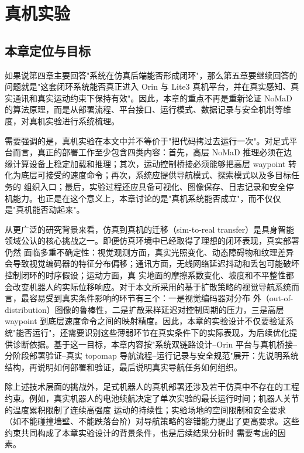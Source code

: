 
\chapter{真机实验}

\section{本章定位与目标}

如果说第四章主要回答"系统在仿真后端能否形成闭环"，那么第五章要继续回答的问题就是"这套闭环系统能否真正进入 Orin 与 Lite3
真机平台，并在真实感知、真实通讯和真实运动约束下保持有效"。因此，本章的重点不再是重新论证 NoMaD
的算法原理，而是从部署流程、平台接口、运行模式、数据记录与安全机制等维度，对真机实验进行系统梳理。

需要强调的是，真机实验在本文中并不等价于"把代码拷过去运行一次"。对足式平台而言，真正的部署工作至少包含四类内容：首先，高层 NoMaD
推理必须在边缘计算设备上稳定加载和推理；其次，运动控制桥接必须能够把高层 waypoint 转化为底层可接受的速度命令；再次，系统应提供导航模式、探索模式以及多目标任务的
组织入口；最后，实验过程还应具备可视化、图像保存、日志记录和安全停机能力。也正是在这个意义上，本章讨论的是"真机系统能否成立"，而不仅仅是"真机能否动起来"。

从更广泛的研究背景来看，仿真到真机的迁移（sim-to-real transfer）是具身智能领域公认的核心挑战之一。即便仿真环境中已经取得了理想的闭环表现，真实部署仍然
面临多重不确定性：视觉观测方面，真实光照变化、动态障碍物和纹理差异会导致视觉编码器的特征分布偏移；通讯方面，无线网络延迟抖动和丢包可能破坏控制闭环的时序假设；运动方面，真
实地面的摩擦系数变化、坡度和不平整性都会改变机器人的实际位移响应。对于本文所采用的基于扩散策略的视觉导航系统而言，最容易受到真实条件影响的环节有三个：一是视觉编码器对分布
外（out-of-distribution）图像的鲁棒性，二是扩散采样延迟对控制周期的压力，三是高层 waypoint
到底层速度命令之间的映射精度。因此，本章的实验设计不仅要验证系统"能否运行"，还需要识别这些薄弱环节在真实条件下的实际表现，为后续优化提供诊断依据。基于这一目标，本章内容按"系统双链路设计--Orin 平台与真机桥接--分阶段部署验证--真实 topomap 导航流程--运行记录与安全规范"展开：先说明系统结构，再说明如何部署和验证，最后说明真实导航任务如何组织。

除上述技术层面的挑战外，足式机器人的真机部署还涉及若干仿真中不存在的工程约束。例如，真实机器人的电池续航决定了单次实验的最长运行时间；机器人关节的温度累积限制了连续高强度
运动的持续性；实验场地的空间限制和安全要求（如不能碰撞墙壁、不能跌落台阶）对导航策略的容错能力提出了更高要求。这些约束共同构成了本章实验设计的背景条件，也是后续结果分析时
需要考虑的因素。

